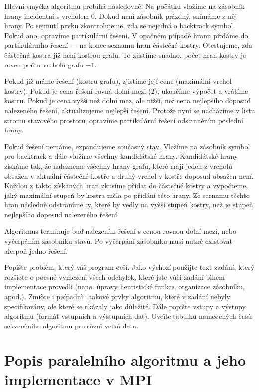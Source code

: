 \documentclass[12pt]{article}
\begin{document}
Hlavní smyčka algoritmu probíhá následovně. Na počátku vložíme na zásobník hrany incidentní s vrcholem 0. Dokud není zásobník prázdný, snímáme z něj hrany. Po sejmutí prvku zkontrolujeme, zda se nejedná o backtrack symbol. Pokud ano, opravíme partikulární řešení. V opačném případě hranu přidáme do partikulárního řesení --- na konec seznamu hran částečné kostry. Otestujeme, zda částečná kostra již není kostrou grafu. To zjistíme snadno, počet hran kostry je roven počtu vrcholů grafu $-1$.

Pokud již máme řešení (kostru grafu), zjistíme její cenu (maximální vrchol kostry). Pokud je cena řešení rovná dolní mezi (2), ukončíme výpočet a vrátíme kostru. Pokud je cena vyšší než dolní mez, ale nižší, než cena nejlepšího doposud nalezeného řešení, aktualizujeme nejlepší řešení. Protože nyní se nacházíme v listu stromu stavového prostoru, opravíme partikulární řešení odstraněním poslední hrany.

Pokud řešení nemáme, expandujeme současný stav. Vložíme na zásobník symbol pro backtrack a dále vložíme všechny kandidátské hrany. Kandidátské hrany získáme tak, že nalezneme všechny hrany grafu, které mají jeden z vrcholů obsažen v aktuální částečné kostře a druhý vrchol v kostře doposud obsažen není. Každou z takto získaných hran zkusíme přidat do částečné kostry a vypočteme, jaký maximální stupeň by kostra měla po přidání této hrany. Ze seznamu těchto hran následně odstraníme ty, které by vedly na vyšší stupeň kostry, než je stupeň nejlepšího doposud nalezeného řešení.

Algoritmus terminuje buď nalezením řešení s cenou rovnou dolní mezi, nebo vyčerpáním zásobníku stavů. Po vyčerpání zásobníku musí nutně existovat alespoň jedno řešení.


Popište problém, který váš program øeší. Jako výchozí použijte text
zadání, který rozšiøte o pøesné vymezení všech odchylek, které jste
vùèi zadání bìhem implementace provedli (napø.  úpravy heuristické
funkce, organizace zásobníku, apod.). Zmiòte i pøípadnì i takové
prvky algoritmu, které v zadání nebyly specifikovány, ale které se
ukázaly jako dùležité.  Dále popište vstupy a výstupy algoritmu
(formát vstupních a výstupních dat). Uveïte tabulku nameøených èasù
sekvenèního algoritmu pro rùznì velká data.

\section{Popis paralelního algoritmu a jeho implementace v MPI}
\end{document}
